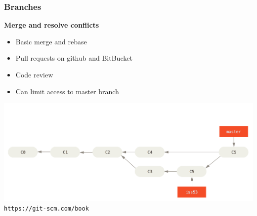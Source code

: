 \documentclass{beamer}
\begin{document}
\begin{frame}
  \frametitle{Branches}
  \textbf{\Large Merge and resolve conflicts}\\[1ex]
  \begin{itemize}
    \item Basic merge and rebase
    \item Pull requests on github and BitBucket
    \item Code review
    \item Can limit access to master branch
  \end{itemize}
  \begin{center}
    \includegraphics[width=0.9\linewidth]{basic-merging-2.png}\\
    {\footnotesize \texttt{https://git-scm.com/book}}
  \end{center}
\end{frame}
\end{document}
